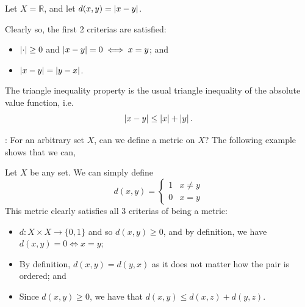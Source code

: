 \documentclass[notoc,notitlepage]{tufte-book}
\begin{document}
\begin{eg}\label{eg:standard_metric_on_r}
  Let $X = \mathbb{R}$, and let $d(x, y) = \left| x - y \right|$.

  Clearly so, the first 2 criterias are satisfied:
  \begin{itemize}
    \item $\left|\cdot\right| \geq 0$ and $\left|x - y\right| = 0 \iff x = y$; and
      \item $\left|x - y\right| = \left| y - x \right|$.
  \end{itemize}
  The triangle inequality property is the usual triangle inequality of the absolute value function, i.e.
  \begin{equation*}
    \left| x - y \right| \leq \left| x \right| + \left| y \right|.
  \end{equation*}
\end{eg}

: For an arbitrary set $X$, can we define a metric on $X$? The following example shows that we can,

\begin{eg}\label{eg:discrete_metric}
  Let $X$ be any set. We can simply define
  \begin{equation*}
    d(x, y) = \begin{cases}
      1 & x \neq y \\
      0 & x = y
    \end{cases}
  \end{equation*}
  This metric clearly satisfies all 3 criterias of being a metric:
  \begin{itemize}
    \item $d : X \times X \to \{ 0, 1 \}$ and so $d(x, y) \geq 0$, and by definition, we have $d(x, y) = 0 \iff x = y$;
    \item By definition, $d(x, y) = d(y, x)$ as it does not matter how the pair is ordered; and
    \item Since $d(x, y) \geq 0$, we have that $d(x, y) \leq d(x, z) + d(y, z)$.
  \end{itemize}
\end{eg}
\end{document}
